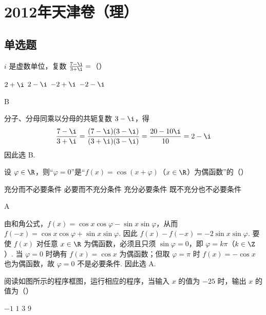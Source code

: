 \chapter{2012年天津卷（理）}

\section{单选题}

\begin{problem}
\(i\) 是虚数单位，复数 \(\frac{7-\i}{3+\i}=\)（\quad）

\choices
    {\(2 + \i\)}
    {\(2 - \i\)}
    {\(-2 + \i\)}
    {\(-2 - \i\)}
\end{problem}

\begin{answer}
B
\end{answer}

\begin{solution}
分子、分母同乘以分母的共轭复数 \(3-\i\)，得
\[
\frac{7-\i}{3+\i}=\frac{(7-\i)(3-\i)}{(3+\i)(3-\i)}=\frac{20-10\i}{10}=2-\i
\]
因此选 B.
\end{solution}

\begin{problem}
设 \(\varphi \in \R\)，则“\(\varphi = 0\)”是“\(f(x) = \cos (x + \varphi)\)（\(x \in \R\)）为偶函数”的（\quad）

\choices
    {充分而不必要条件}
    {必要而不充分条件}
    {充分必要条件}
    {既不充分也不必要条件}
\end{problem}

\begin{answer}
A
\end{answer}

\begin{solution}
由和角公式，\(f(x)=\cos x\cos\varphi-\sin x\sin\varphi\)，从而 \(f(-x)=\cos x\cos\varphi+\sin x\sin\varphi\). 因此 \(f(x)-f(-x)=-2\sin x\sin\varphi\). 要使 \(f(x)\) 对任意 \(x\in\R\) 为偶函数，必须且只须 \(\sin\varphi=0\)，即 \(\varphi=k\pi\)（\(k\in\Z\)）. 当 \(\varphi=0\) 时确有 \(f(x)=\cos x\) 为偶函数；但取 \(\varphi=\pi\) 时 \(f(x)=-\cos x\) 也为偶函数，故 \(\varphi=0\) 不是必要条件. 因此选 A.
\end{solution}

\begin{problem}
阅读如图所示的程序框图，运行相应的程序，当输入 \(x\) 的值为 \(-25\) 时，输出 \(x\) 的值为（\quad）


\choices
    {\(-1\)}
    {\(1\)}
    {\(3\)}
    {\(9\)}
\end{problem}

